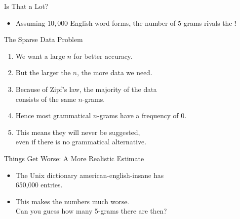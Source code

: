 \documentclass[professionalfonts, xcolor={usenames,svgnames,x11names,table}]{beamer}
\begin{document}
\begin{frame}{Is That a Lot?}
    \begin{itemize}
        \item Assuming $10,000$ English word forms, the number of $5$-grams rivals the !
    \end{itemize}

    \begin{block}{The Sparse Data Problem}
        \begin{enumerate}
            \item We want a large $n$ for better accuracy.
            \item But the larger the $n$, the more data we need.
            \item Because of Zipf's law, the majority of the data\\
                    consists of the same $n$-grams. 
            \item Hence most grammatical $n$-grams have a frequency of $0$. 
            \item This means they will never be suggested,\\
                even if there is no grammatical alternative.
        \end{enumerate}
    \end{block}
\end{frame}

\begin{frame}{Things Get Worse: A More Realistic Estimate}
    \begin{itemize}
        \item The Unix dictionary american-english-insane has\\
            650,000 entries.
        \item This makes the numbers much worse.\\
            Can you guess how many 5-grams there are then?
    \end{itemize}

    \begin{center}

    \end{center}
        
    \medskip
\end{frame}
\end{document}
